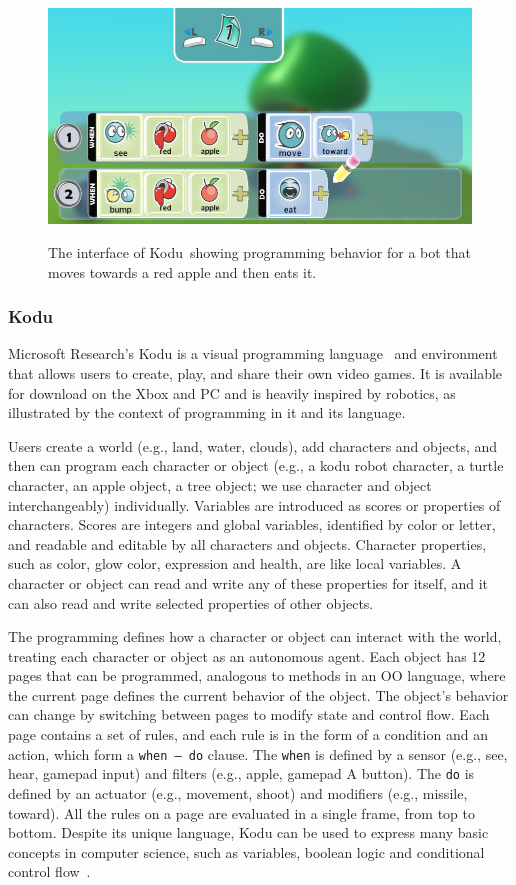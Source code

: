 \documentclass[conference]{IEEEtran}
\begin{document}
\begin{figure}[tb]
\caption{The interface of Kodu~showing programming behavior for a bot that moves towards a red apple and then eats it.}
\centering
\includegraphics[width=\columnwidth]{img/programmingui.png}
\label{fig:Kodu}
\end{figure}

\subsubsection{Kodu}
Microsoft Research's Kodu is a visual programming language~\cite{kodugrammar} and environment that allows users to create, play, and share their own video games. 
It is available for download on the Xbox and PC and is heavily inspired by robotics, as illustrated by the context of programming in it and its language. 


Users create a world (e.g., land, water, clouds),  add characters and objects, and then can program each character or object (e.g., a kodu robot character, a turtle character, an apple object, a tree object; we use character and object interchangeably) individually. Variables are introduced as scores or properties of characters. Scores are integers and global variables, identified by color or letter, and readable and editable by all characters and objects. Character properties, such as color, glow color, expression and health, are like local variables. A character or object can read and write any of these properties for itself, and it can also read and write selected properties of other objects. 

The programming defines how a character or object can interact with the world, treating each character or object as an autonomous agent. Each object has 12 pages that can be programmed, analogous to methods in an OO language, where the current page defines the current behavior of the object. 
The object's behavior can change by switching between pages to modify state and control flow. 
Each page contains a set of rules, and each rule is in the form of a condition and an action, which form a {\tt when~--~do} clause. The {\tt when} is defined by a sensor (e.g., see, hear, gamepad input) and filters (e.g., apple, gamepad A button). The {\tt do} is defined by an actuator (e.g., movement, shoot) and modifiers (e.g., missile, toward). All the rules on a page are evaluated in a single frame, from top to bottom. 
Despite its unique language, Kodu  can be used to express many basic concepts in computer science, such as variables, boolean logic and conditional control flow~\cite{Stolee:2011:ECS:1953163.1953197}. 
\end{document}
